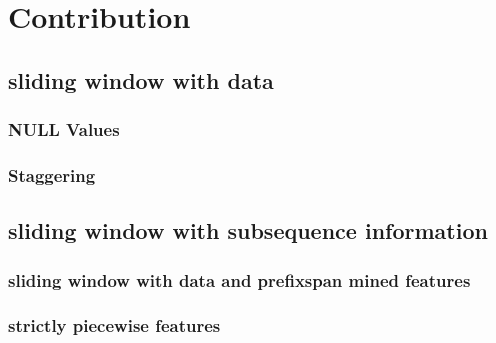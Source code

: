 \chapter{Contribution}\label{sec:contribution}


\section{sliding window with data}
\subsection{NULL Values}
\subsection{Staggering}

\section{sliding window with subsequence information}
\subsection{sliding window with data and prefixspan mined features}
\subsection{strictly piecewise features}



